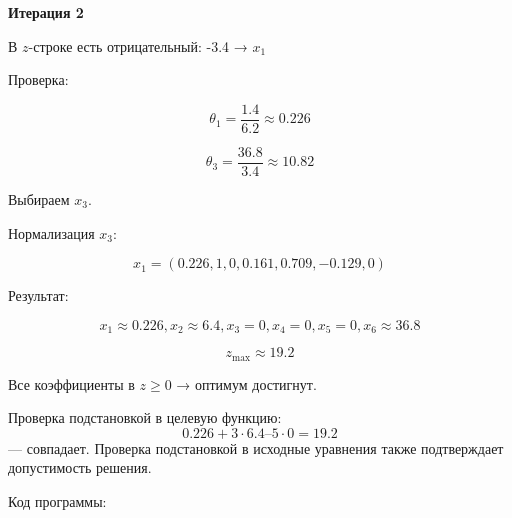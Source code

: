 \documentclass[a4paper,14pt]{extarticle}
\begin{document}
\textbf{Итерация 2}

В $z$-строке есть отрицательный: -3.4 → $x_1$

Проверка:

\[
\theta_1=\frac{1.4}{6.2}\approx0.226
\]

\[
\theta_3=\frac{36.8}{3.4}\approx10.82
\]

Выбираем $x_3$.

Нормализация $x_3$:

\[
x_1=(0.226,1,0,0.161,0.709,-0.129,0)
\]

Результат:

\[
x_1\approx0.226,x_2\approx6.4,x_3=0,x_4=0,x_5=0,x_6\approx36.8
\]

\[
z_{\max}\approx19.2
\]

Все коэффициенты в $z \geq 0$ → оптимум достигнут.

Проверка подстановкой в целевую функцию: \[0.226 + 3 \cdot 6.4 – 5 \cdot 0 = 19.2\] — совпадает. Проверка подстановкой в исходные уравнения также подтверждает допустимость решения.

\vspace{1cm}

Код программы:
\end{document}
